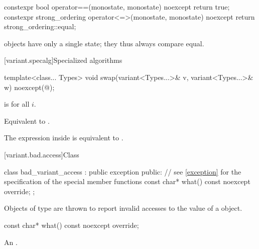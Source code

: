 %
%
\begin{itemdecl}
constexpr bool operator==(monostate, monostate) noexcept { return true; }
constexpr strong_ordering operator<=>(monostate, monostate) noexcept
{ return strong_ordering::equal; }
\end{itemdecl}

\begin{itemdescr}
\pnum
\begin{note}
 objects have only a single state; they thus always compare equal.
\end{note}
\end{itemdescr}

[variant.specalg]{Specialized algorithms}

%
\begin{itemdecl}
template<class... Types>
  void swap(variant<Types...>& v, variant<Types...>& w) noexcept(@\seebelow@);
\end{itemdecl}

\begin{itemdescr}
\pnum
\constraints
{}
is  for all $i$.

\pnum
\effects
Equivalent to .

\pnum
\remarks
The expression inside  is equivalent to .
\end{itemdescr}

%
[variant.bad.access]{Class }

\begin{codeblock}
class bad_variant_access : public exception {
public:
  // see \ref{exception} for the specification of the special member functions
  const char* what() const noexcept override;
};
\end{codeblock}

\pnum
Objects of type  are thrown to report invalid
accesses to the value of a  object.

%
\begin{itemdecl}
const char* what() const noexcept override;
\end{itemdecl}

\begin{itemdescr}
\pnum
\returns
An  \ntbs{}.
\end{itemdescr}

